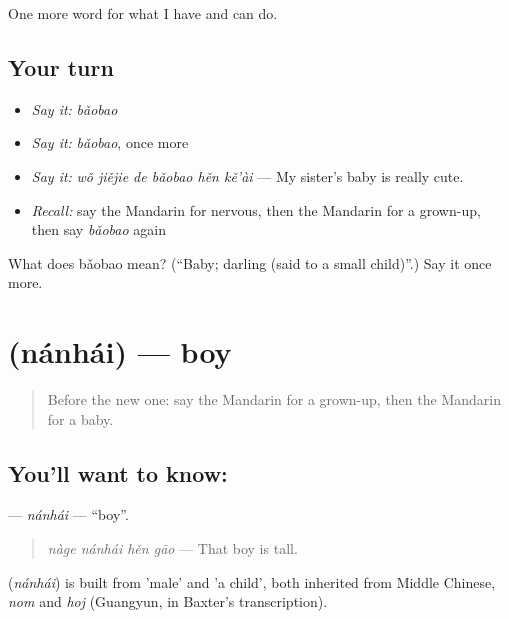 \begin{grammarlens}[title={What you've built}]
One more word for what I have and can do.
\end{grammarlens}

\subsection*{Your turn}
\begin{itemize}
\raggedright
  \item \emph{Say it:} \emph{bǎobao}
  \item \emph{Say it:} \emph{bǎobao}, once more
  \item \emph{Say it:} \emph{wǒ jiějie de bǎobao hěn kě'ài} — My sister's baby is really cute.
  \item \emph{Recall:} say the Mandarin for nervous, then the Mandarin for a grown-up, then say \emph{bǎobao} again
\end{itemize}

\begin{tcolorbox}[breakable,colback=teal!4,colframe=teal!35!black,title={Before you move on}]
What does bǎobao mean? (\textquotedblleft{}Baby; darling (said to a small child)\textquotedblright{}.) Say it once more.
\end{tcolorbox}
\section[\texorpdfstring{\zh{男孩} (nánhái)}{男孩 (nánhái)}]{ (nánhái) — boy}

\label{lesson:ZH-C266-nanhai}



\begin{quote}
Before the new one: say the Mandarin for a grown-up, then the Mandarin for a baby.
\end{quote}

\subsection*{You'll want to know: }
\textbf{} — \emph{nánhái} — \textquotedblleft{}boy\textquotedblright{}.

\begin{quote}
\textbf{} \emph{nàge nánhái hěn gāo} — That boy is tall.
\end{quote}

\begin{cousinweb}
\textbf{} (\emph{nánhái}) is built from  'male' and  'a child', both inherited from Middle Chinese, \emph{nom} and \emph{hoj} (Guangyun, in Baxter's transcription).
\end{cousinweb}


